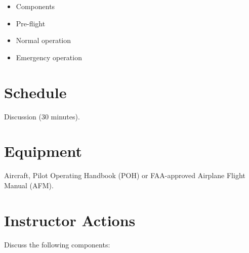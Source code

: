 \documentclass[twoside,openright]{report}
\begin{document}
\begin{itemize}
  \item Components
  \item Pre-flight
  \item Normal operation
  \item Emergency operation
\end{itemize}

\section{Schedule}

Discussion (30 minutes).

\section{Equipment}

Aircraft, Pilot Operating Handbook (POH) or FAA-approved Airplane Flight Manual (AFM).

\section{Instructor Actions}

Discuss the following components:
\end{document}
